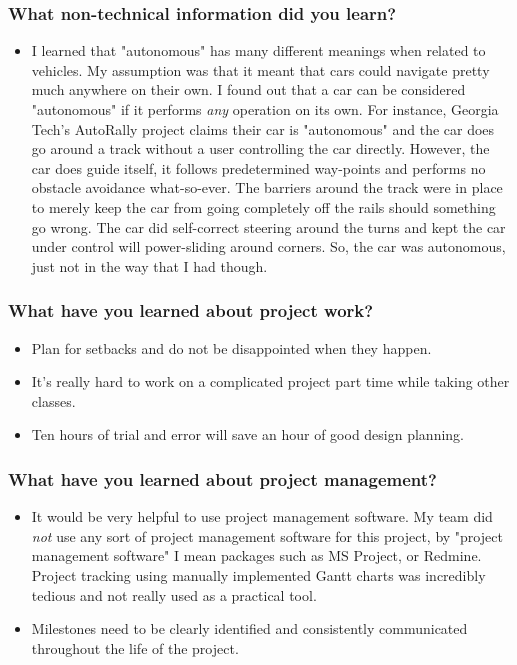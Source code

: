 \documentclass[compsoc,draftclsnofoot,onecolumn,10pt]{IEEEtran}
\begin{document}
\subsubsection*{What non-technical information did you learn?}
\begin{itemize}
    \item I learned that "autonomous" has many different meanings when related to vehicles. My assumption was that it meant that cars could navigate pretty much anywhere on their own. I found out that a car can be considered "autonomous" if it performs \textit{any} operation on its own. For instance, Georgia Tech's AutoRally project claims their car is "autonomous" and the car does go around a track without a user controlling the car directly. However, the car does guide itself, it follows predetermined way-points and performs no obstacle avoidance what-so-ever. The barriers around the track were in place to merely keep the car from going completely off the rails should something go wrong. The car did self-correct steering around the turns and kept the car under control will power-sliding around corners. So, the car was autonomous, just not in the way that I had though.
\end{itemize}

\subsubsection*{What have you learned about project work?}
\begin{itemize}
\item Plan for setbacks and do not be disappointed when they happen.
    \item It's really hard to work on a complicated project part time while taking other classes.
    \item Ten hours of trial and error will save an hour of good design planning.
\end{itemize}

\subsubsection*{ What have you learned about project management?}
\begin{itemize}
    \item It would be very helpful to use project management software.
    \subitem My team did \textit{not} use any sort of project management software for this project, by "project management software" I mean packages such as MS Project, or Redmine. Project tracking using manually implemented Gantt charts was incredibly tedious and not really used as a practical tool.
    \item Milestones need to be clearly identified and consistently communicated throughout the life of the project.
\end{itemize}
\end{document}
